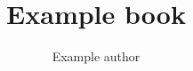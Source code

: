 \documentclass[lang=magyar]{math-book}
\title{Example book}
\author{Example author}
\begin{document}
\frontmatter

\begin{titlepage}
  \maketitle
\end{titlepage}

\tableofcontents

\mainmatter



\end{document}
